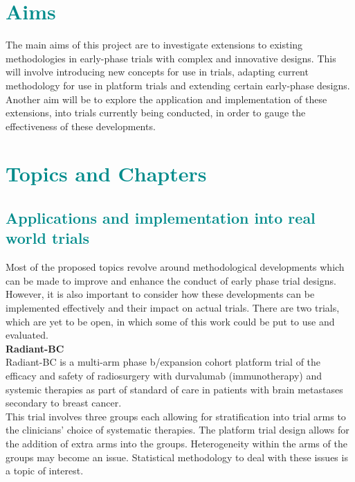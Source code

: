 \documentclass[a4paper, 11pt]{article} %
\newcommand{\RN}[1]{
	\textup{\uppercase\expandafter{\romannumeral#1}}} %
\begin{document}
\section{\textcolor{DarkCyan}{Aims}}
The main aims of this project are to investigate extensions to existing methodologies in early-phase trials with complex and innovative designs. This will involve introducing new concepts for use in trials, adapting current methodology for use in platform trials and extending certain early-phase designs. Another aim will be to explore the application and implementation of these extensions, into trials currently being conducted, in order to gauge the effectiveness of these developments. 


\section{\textcolor{DarkCyan}{Topics and Chapters}}

\subsection{\textcolor{DarkCyan}{Applications and implementation into real world trials}} 

Most of the proposed topics revolve around methodological developments which can be made to improve and enhance the conduct of early phase trial designs. However, it is also important to consider how these developments can be implemented effectively and their impact on actual trials. There are two trials, which are yet to be open, in which some of this work could be put to use and evaluated.\\ 

\noindent \textbf{Radiant-BC}\\
\noindent Radiant-BC is a  multi-arm phase\RN{1}b/expansion cohort platform trial of the efficacy and safety of radiosurgery with durvalumab (immunotherapy) and systemic therapies as part of standard of care in patients with brain metastases secondary to breast cancer. \\

\noindent This trial involves three groups each allowing for stratification into trial arms to the clinicians' choice of systematic therapies. The platform trial design allows for the addition of extra arms into the groups. Heterogeneity within the arms of the groups may become an issue. Statistical methodology to deal with these issues is a topic of interest. \\
\end{document}
